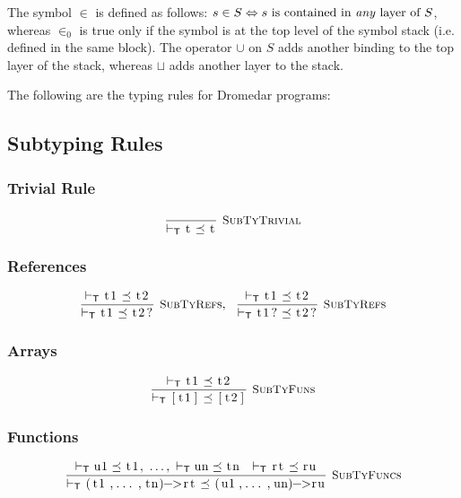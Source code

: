 \documentclass{article}
\newcommand{\code}[1]{\lstinline[columns=fixed]{#1}}
\newcommand{\drmrule}[5]{\frac{#1}{#2\vdash_{\mathsf{#3}}#4}\textsc{\ \small{#5}}}
\newcommand{\ruleapp}[1]{\vdash_{\mathsf{#1}}}
\newcommand{\mc}[1]{\textnormal{\code{#1}}}
\begin{document}
		The symbol $\in$ is defined as follows: $s\in S \Leftrightarrow \textnormal{$s$ is contained in \textit{any} layer of $S$}$, whereas $\in_0$ is true only if the symbol is at the top level of the symbol stack (i.e. defined in the same block). The operator $\cup$ on $S$ adds another binding to the top layer of the stack, whereas $\sqcup$ adds another layer to the stack.
		
		The following are the typing rules for Dromedar programs:
		
		\subsection{Subtyping Rules}
		
			\subsubsection{Trivial Rule}
			
				\begin{align*}
					\drmrule{}{}{T}{\mc{t} \preceq \mc{t}}{SubTyTrivial}
				\end{align*}
				
			\subsubsection{References}
			
				\begin{align*}
					\drmrule{\ruleapp{T}\mc{t1} \preceq \mc{t2}}{}{T}{\mc{t1} \preceq \mc{t2?}}{SubTyRefs},\ \ 
					\drmrule{\ruleapp{T}\mc{t1}\preceq\mc{t2}}{}{T}{\mc{t1?} \preceq \mc{t2?}}{SubTyRefs}
				\end{align*}
				
			\subsubsection{Arrays}
			
				\begin{align*}
					\drmrule{\ruleapp{T}\mc{t1}\preceq\mc{t2}}{}{T}{\mc{[t1]}\preceq\mc{[t2]}}{SubTyFuns}
				\end{align*}
		
			\subsubsection{Functions}
			
				\begin{align*}
					\drmrule{\ruleapp{T}\mc{u1}\preceq\mc{t1},\ \dots,\ \ruleapp{T}\mc{un}\preceq\mc{tn}\ \ \ruleapp{T}\mc{rt}\preceq\mc{ru}}{}{T}{\mc{(t1,...,tn)->rt} \preceq \mc{(u1,...,un)->ru}}{SubTyFuncs}
				\end{align*}
				
\end{document}
